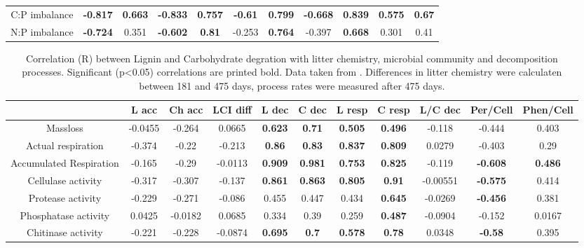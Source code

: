 \documentclass[10pt]{article}
\begin{document}
\begin{table}[h!]
\begin{center}
{\begin{tabular}{ccccccccccc}
  C:P imbalance & \textbf{ -0.817 } & \textbf{ 0.663 } & \textbf{ -0.833 } & \textbf{ 0.757 } & \textbf{ -0.61 } & \textbf{ 0.799 } & \textbf{ -0.668 } & \textbf{ 0.839 } & \textbf{ 0.575 } & \textbf{ 0.67 } \\ 
  N:P imbalance & \textbf{ -0.724 } & 0.351 & \textbf{ -0.602 } & \textbf{ 0.81 } & -0.253 & \textbf{ 0.764 } & -0.397 & \textbf{ 0.668 } & 0.301 & 0.41 \\ 
   \hline
\end{tabular}
}
\end{center}
\end{table}
\newpage
\begin{table}[h!]
\begin{center}
\caption{Correlation (R) between Lignin and Carbohydrate degration with litter chemistry, microbial community and decomposition processes. Significant (p<0.05) correlations are printed bold. Data taken from \cite{Mooshammer2011, Leitner2011}. Differences in litter chemistry were calculaten between 181 and 475 days, process rates were measured after 475 days.}
\label{corrtable2}
{\tiny
\begin{tabular}{ccccccccccc}
  \hline
 & L acc & Ch acc & LCI diff & L dec & C dec & L resp & C resp & L/C dec & Per/Cell & Phen/Cell \\ 
  \hline
Massloss & -0.0455 & -0.264 & 0.0665 & \textbf{ 0.623 } & \textbf{ 0.71 } & \textbf{ 0.505 } & \textbf{ 0.496 } & -0.118 & -0.444 & 0.403 \\ 
  Actual respiration & -0.374 & -0.22 & -0.213 & \textbf{ 0.86 } & \textbf{ 0.83 } & \textbf{ 0.837 } & \textbf{ 0.809 } & 0.0279 & -0.403 & 0.29 \\ 
  Accumulated Respiration & -0.165 & -0.29 & -0.0113 & \textbf{ 0.909 } & \textbf{ 0.981 } & \textbf{ 0.753 } & \textbf{ 0.825 } & -0.119 & \textbf{ -0.608 } & \textbf{ 0.486 } \\ 
  Cellulase activity & -0.317 & -0.307 & -0.137 & \textbf{ 0.861 } & \textbf{ 0.863 } & \textbf{ 0.805 } & \textbf{ 0.91 } & -0.00551 & \textbf{ -0.575 } & 0.414 \\ 
  Protease activity & -0.229 & -0.271 & -0.086 & 0.455 & 0.447 & 0.434 & \textbf{ 0.645 } & -0.0269 & \textbf{ -0.456 } & 0.381 \\ 
  Phosphatase activity & 0.0425 & -0.0182 & 0.0685 & 0.334 & 0.39 & 0.259 & \textbf{ 0.487 } & -0.0904 & -0.152 & 0.0167 \\ 
  Chitinase activity & -0.221 & -0.228 & -0.0874 & \textbf{ 0.695 } & \textbf{  0.7 } & \textbf{ 0.578 } & \textbf{ 0.78 } & 0.0348 & \textbf{ -0.58 } & 0.395 \\ 

\end{tabular}}
\end{center}
\end{table}
\end{document}
